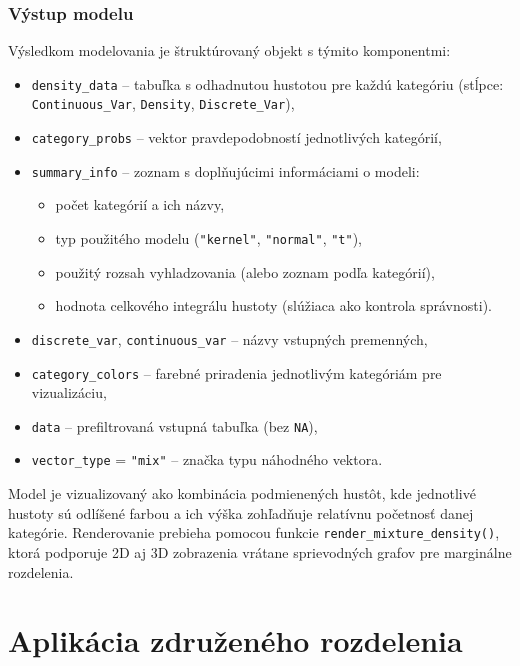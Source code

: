 \subsubsection{Výstup modelu}

Výsledkom modelovania je štruktúrovaný objekt s týmito komponentmi:

\begin{itemize}
  \item \texttt{density\_data} – tabuľka s odhadnutou hustotou pre každú kategóriu (stĺpce: \texttt{Continuous\_Var}, \texttt{Density}, \texttt{Discrete\_Var}),
  \item \texttt{category\_probs} – vektor pravdepodobností jednotlivých kategórií,
  \item \texttt{summary\_info} – zoznam s doplňujúcimi informáciami o modeli:
    \begin{itemize}
      \item počet kategórií a ich názvy,
      \item typ použitého modelu (\texttt{"kernel"}, \texttt{"normal"}, \texttt{"t"}),
      \item použitý rozsah vyhladzovania (alebo zoznam podľa kategórií),
      \item hodnota celkového integrálu hustoty (slúžiaca ako kontrola správnosti).
    \end{itemize}
  \item \texttt{discrete\_var}, \texttt{continuous\_var} – názvy vstupných premenných,
  \item \texttt{category\_colors} – farebné priradenia jednotlivým kategóriám pre vizualizáciu,
  \item \texttt{data} – prefiltrovaná vstupná tabuľka (bez \texttt{NA}),
  \item \texttt{vector\_type} = \texttt{"mix"} – značka typu náhodného vektora.
\end{itemize}

Model je vizualizovaný ako kombinácia podmienených hustôt, kde jednotlivé hustoty sú odlíšené farbou a ich výška zohľadňuje relatívnu početnosť danej kategórie. Renderovanie prebieha pomocou funkcie \texttt{render\_mixture\_density()}, ktorá podporuje 2D aj 3D zobrazenia vrátane sprievodných grafov pre marginálne rozdelenia.


\section{Aplikácia združeného rozdelenia}\label{sec:app_joint_dist}


